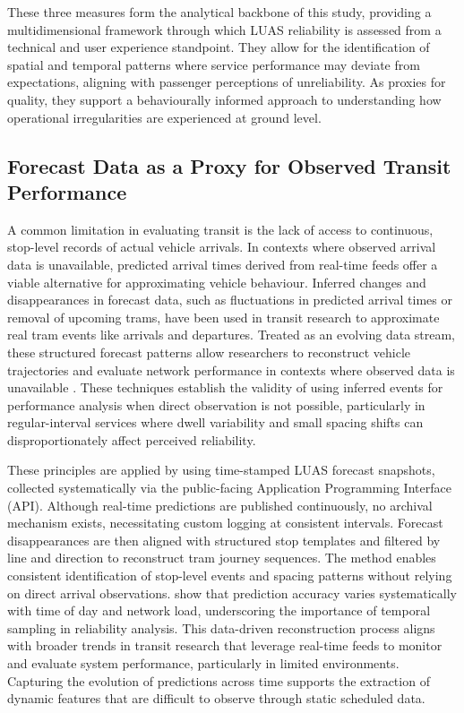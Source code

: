     These three measures form the analytical backbone of this study, providing a multidimensional framework through which LUAS reliability is assessed from a technical and user experience standpoint. They allow for the identification of spatial and temporal patterns where service performance may deviate from expectations, aligning with passenger perceptions of unreliability. As proxies for quality, they support a behaviourally informed approach to understanding how operational irregularities are experienced at ground level.

\subsection*{Forecast Data as a Proxy for Observed Transit Performance}

    A common limitation in evaluating transit is the lack of access to continuous, stop-level records of actual vehicle arrivals. In contexts where observed arrival data is unavailable, predicted arrival times derived from real-time feeds offer a viable alternative for approximating vehicle behaviour. Inferred changes and disappearances in forecast data, such as fluctuations in predicted arrival times or removal of upcoming trams, have been used in transit research to approximate real tram events like arrivals and departures. Treated as an evolving data stream, these structured forecast patterns allow researchers to reconstruct vehicle trajectories and evaluate network performance in contexts where observed data is unavailable \parencites{sun2016smart}{muller2001trip}. These techniques establish the validity of using inferred events for performance analysis when direct observation is not possible, particularly in regular-interval services where dwell variability and small spacing shifts can disproportionately affect perceived reliability.

    These principles are applied by using time-stamped LUAS forecast snapshots, collected systematically via the public-facing Application Programming Interface (API). Although real-time predictions are published continuously, no archival mechanism exists, necessitating custom logging at consistent intervals. Forecast disappearances are then aligned with structured stop templates and filtered by line and direction to reconstruct tram journey sequences. The method enables consistent identification of stop-level events and spacing patterns without relying on direct arrival observations. \textcite{xu2017arrival} show that prediction accuracy varies systematically with time of day and network load, underscoring the importance of temporal sampling in reliability analysis. This data-driven reconstruction process aligns with broader trends in transit research that leverage real-time feeds to monitor and evaluate system performance, particularly in limited environments. Capturing the evolution of predictions across time supports the extraction of dynamic features that are difficult to observe through static scheduled data.

